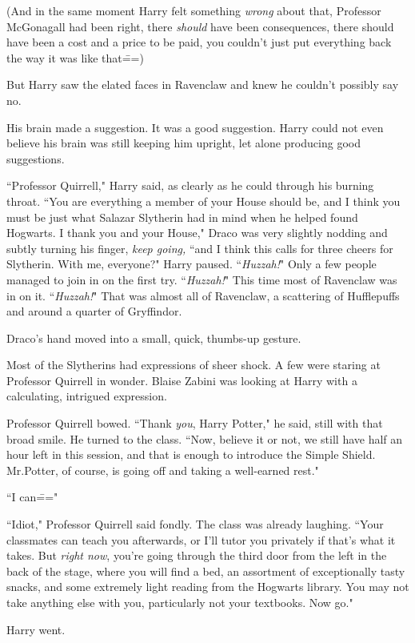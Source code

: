 (And in the same moment Harry felt something \emph{wrong} about that, Professor McGonagall had been right, there \emph{should} have been consequences, there should have been a cost and a price to be paid, you couldn't just put everything back the way it was like that\===)

But Harry saw the elated faces in Ravenclaw and knew he couldn't possibly say no.

His brain made a suggestion. It was a good suggestion. Harry could not even believe his brain was still keeping him upright, let alone producing good suggestions.

``Professor Quirrell," Harry said, as clearly as he could through his burning throat. ``You are everything a member of your House should be, and I think you must be just what Salazar Slytherin had in mind when he helped found Hogwarts. I thank you and your House," Draco was very slightly nodding and subtly turning his finger, \emph{keep going,} ``and I think this calls for three cheers for Slytherin. With me, everyone?" Harry paused. ``\emph{Huzzah!}" Only a few people managed to join in on the first try. ``\emph{Huzzah!}" This time most of Ravenclaw was in on it. ``\emph{Huzzah!}" That was almost all of Ravenclaw, a scattering of Hufflepuffs and around a quarter of Gryffindor.

Draco's hand moved into a small, quick, thumbs-up gesture.

Most of the Slytherins had expressions of sheer shock. A few were staring at Professor Quirrell in wonder. Blaise Zabini was looking at Harry with a calculating, intrigued expression.

Professor Quirrell bowed. ``Thank \emph{you}, Harry Potter," he said, still with that broad smile. He turned to the class. ``Now, believe it or not, we still have half an hour left in this session, and that is enough to introduce the Simple Shield. Mr.\?Potter, of course, is going off and taking a well-earned rest."

``I can\==="

``Idiot," Professor Quirrell said fondly. The class was already laughing. ``Your classmates can teach you afterwards, or I'll tutor you privately if that's what it takes. But \emph{right now}, you're going through the third door from the left in the back of the stage, where you will find a bed, an assortment of exceptionally tasty snacks, and some extremely light reading from the Hogwarts library. You may not take anything else with you, particularly not your textbooks. Now go."

Harry went.

